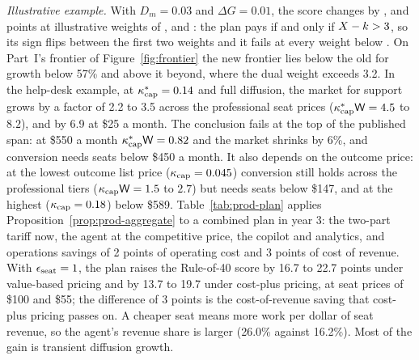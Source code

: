 \noindent\emph{Illustrative example.} With $D_m=0.03$ and $\Delta G=0.01$, the score changes by \prodDilOne, \prodDilTwo{} and \prodDilThree{} points at illustrative weights of \prodXbOne, \prodXbTwo{} and \prodXbThree: the plan pays if and only if $X-k>3$, so its sign flips between the first two weights and it fails at every weight below \prodDilFlip. %
On Part~I's frontier of Figure~\ref{fig:frontier} the new frontier lies below the old for growth below 57\% and above it beyond, where the dual weight exceeds 3.2. In the help-desk example, at $\kappa^*_{\rm cap}=0.14$ and full diffusion, the market for support grows by a factor of 2.2 to 3.5 across the professional seat prices ($\kappa^*_{\rm cap}\mathsf W=4.5$ to $8.2$), and by 6.9 at \$25 a month. The conclusion fails at the top of the published span: at \$550 a month $\kappa^*_{\rm cap}\mathsf W=0.82$ and the market shrinks by 6\%, and conversion needs seats below \$450 a month. It also depends on the outcome price: at the lowest outcome list price ($\kappa_{\rm cap}=0.045$) conversion still holds across the professional tiers ($\kappa_{\rm cap}\mathsf W=1.5$ to $2.7$) but needs seats below \$147, and at the highest ($\kappa_{\rm cap}=0.18$) below \$589. Table~\ref{tab:prod-plan} applies Proposition~\ref{prop:prod-aggregate} to a combined plan in year 3: the two-part tariff now, the agent at the competitive price, the copilot and analytics, and operations savings of 2 points of operating cost and 3 points of cost of revenue. With $\epsilon_{\rm seat}=1$, the plan raises the Rule-of-40 score by 16.7 to 22.7 points under value-based pricing and by 13.7 to 19.7 under cost-plus pricing, at seat prices of \$100 and \$55; the difference of 3 points is the cost-of-revenue saving that cost-plus pricing passes on. A cheaper seat means more work per dollar of seat revenue, so the agent's revenue share is larger (26.0\% against 16.2\%). Most of the gain is transient diffusion growth.


